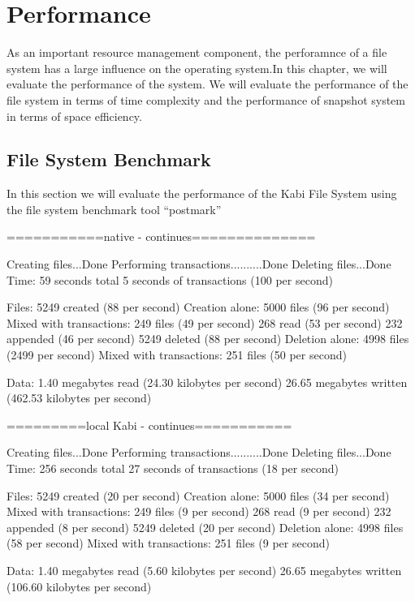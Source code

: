 \chapter{Performance}
\label{chap:perform}

    As an important resource management component, the perforamnce of a file system has a large influence on the operating system.In this chapter, we will evaluate the performance of the system. We will evaluate the performance of the file system in terms of time complexity and the performance of snapshot system in terms of space efficiency.

\section{File System Benchmark}

In this section we will evaluate the performance of the Kabi File System using the file system benchmark tool ``postmark''\cite{postmark} 

===========native - continues==============

Creating files...Done
Performing transactions..........Done
Deleting files...Done
Time:
	59 seconds total
	5 seconds of transactions (100 per second)

Files:
	5249 created (88 per second)
		Creation alone: 5000 files (96 per second)
		Mixed with transactions: 249 files (49 per second)
	268 read (53 per second)
	232 appended (46 per second)
	5249 deleted (88 per second)
		Deletion alone: 4998 files (2499 per second)
		Mixed with transactions: 251 files (50 per second)

Data:
	1.40 megabytes read (24.30 kilobytes per second)
	26.65 megabytes written (462.53 kilobytes per second)

=========local Kabi - continues===========

Creating files...Done
Performing transactions..........Done
Deleting files...Done
Time:
	256 seconds total
	27 seconds of transactions (18 per second)

Files:
	5249 created (20 per second)
		Creation alone: 5000 files (34 per second)
		Mixed with transactions: 249 files (9 per second)
	268 read (9 per second)
	232 appended (8 per second)
	5249 deleted (20 per second)
		Deletion alone: 4998 files (58 per second)
		Mixed with transactions: 251 files (9 per second)

Data:
	1.40 megabytes read (5.60 kilobytes per second)
	26.65 megabytes written (106.60 kilobytes per second)


